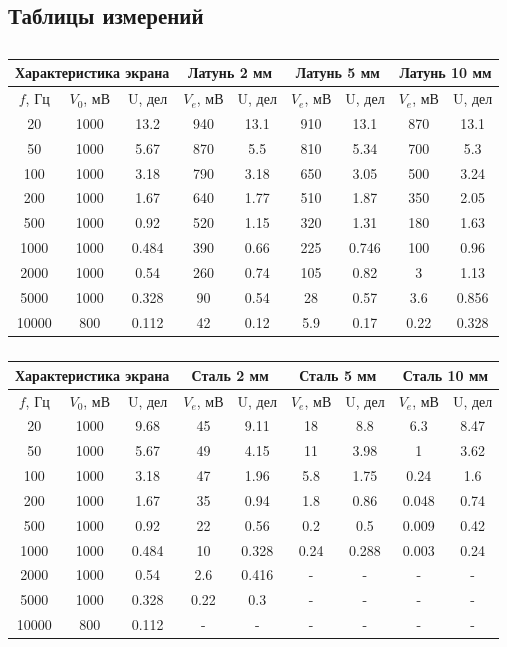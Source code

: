 \subsection{Таблицы измерений}
\begin{table}[H]
	\centering
	\begin{tabular}{|c|c|c|c|c|c|c|c|c|}
	\hline
	\multicolumn{3}{|c|}{Характеристика экрана}& \multicolumn{2}{c|}{Латунь 2 мм} & \multicolumn{2}{c|}{Латунь 5 мм} & \multicolumn{2}{c|}{Латунь 10 мм} \\ \hline
	\multicolumn{1}{|c|}{$f$, Гц} & \multicolumn{1}{c|}{$V_0$, мВ} & \multicolumn{1}{c|}{U, дел} &	\multicolumn{1}{c|}{$V_e$, мВ}&U, дел  & $V_e$, мВ &U, дел&$V_e$, мВ&U, дел\\
	\hline
	20&1000&13.2&940&13.1&910&13.1&870&13.1\\ \hline
	50&1000&5.67&870&5.5&810&5.34&700&5.3\\ \hline
	100&1000&3.18&790&3.18&650&3.05&500&3.24\\ \hline
	200&1000&1.67&640&1.77&510&1.87&350&2.05\\ \hline
	500&1000&0.92&520&1.15&320&1.31&180&1.63\\ \hline
	1000&1000&0.484&390&0.66&225&0.746&100&0.96\\ \hline
	2000&1000&0.54&260&0.74&105&0.82&3&1.13\\ \hline
	5000&1000&0.328&90&0.54&28&0.57&3.6&0.856\\ \hline
	10000&800&0.112&42&0.12&5.9&0.17&0.22&0.328\\ \hline
	\end{tabular}
	\caption{}
	\label{tab:lead}
\end{table}

\begin{table}[H]
	\centering
	\begin{tabular}{|c|c|c|c|c|c|c|c|c|}
	\hline
	\multicolumn{3}{|c|}{Характеристика экрана}& \multicolumn{2}{c|}{Сталь 2 мм} & \multicolumn{2}{c|}{Сталь 5 мм} & \multicolumn{2}{c|}{Сталь 10 мм} \\ \hline
	\multicolumn{1}{|c|}{$f$, Гц} & \multicolumn{1}{c|}{$V_0$, мВ} & \multicolumn{1}{c|}{U, дел} &	\multicolumn{1}{c|}{$V_e$, мВ}&U, дел  & $V_e$, мВ &U, дел&$V_e$, мВ&U, дел\\
	\hline
	20&1000&9.68&45&9.11&18&8.8&6.3&8.47\\ \hline
	50&1000&5.67&49&4.15&11&3.98&1&3.62\\ \hline
	100&1000&3.18&47&1.96&5.8&1.75&0.24&1.6\\ \hline
	200&1000&1.67&35&0.94&1.8&0.86&0.048&0.74\\ \hline
	500&1000&0.92&22&0.56&0.2&0.5&0.009&0.42\\ \hline
	1000&1000&0.484&10&0.328&0.24&0.288&0.003&0.24\\ \hline
	2000&1000&0.54&2.6&0.416 & -&- & -&- \\ \hline
	5000&1000&0.328&0.22& 0.3 &- &- &- &- \\ \hline
	10000&800&0.112&- & -&- &- & -&-\\ \hline
	\end{tabular}
	\caption{}
	\label{tab:steel}
\end{table}



